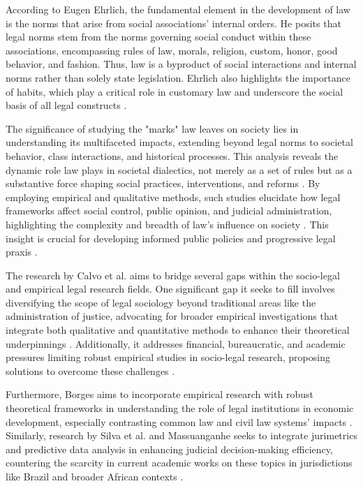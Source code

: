According to Eugen Ehrlich, the fundamental element in the development of law is the norms that arise from social associations' internal orders. He posits that legal norms stem from the norms governing social conduct within these associations, encompassing rules of law, morals, religion, custom, honor, good behavior, and fashion. Thus, law is a byproduct of social interactions and internal norms rather than solely state legislation. Ehrlich also highlights the importance of habits, which play a critical role in customary law and underscore the social basis of all legal constructs \cite{venturini2024, venturini2024p24-25, venturini2024p22-23, venturini2024p18-19}.

The significance of studying the "marks" law leaves on society lies in understanding its multifaceted impacts, extending beyond legal norms to societal behavior, class interactions, and historical processes. This analysis reveals the dynamic role law plays in societal dialectics, not merely as a set of rules but as a substantive force shaping social practices, interventions, and reforms \cite{law1982, calvo2024}. By employing empirical and qualitative methods, such studies elucidate how legal frameworks affect social control, public opinion, and judicial administration, highlighting the complexity and breadth of law's influence on society \cite{calvo2024, law1982}. This insight is crucial for developing informed public policies and progressive legal praxis \cite{massuanganhe2016, law1982}.

The research by Calvo et al. aims to bridge several gaps within the socio-legal and empirical legal research fields. One significant gap it seeks to fill involves diversifying the scope of legal sociology beyond traditional areas like the administration of justice, advocating for broader empirical investigations that integrate both qualitative and quantitative methods to enhance their theoretical underpinnings \cite{calvo2024, calvo2024}. Additionally, it addresses financial, bureaucratic, and academic pressures limiting robust empirical studies in socio-legal research, proposing solutions to overcome these challenges \cite{calvo2024}.

Furthermore, Borges aims to incorporate empirical research with robust theoretical frameworks in understanding the role of legal institutions in economic development, especially contrasting common law and civil law systems' impacts \cite{borges2015, borges2015}. Similarly, research by Silva et al. and Massuanganhe seeks to integrate jurimetrics and predictive data analysis in enhancing judicial decision-making efficiency, countering the scarcity in current academic works on these topics in jurisdictions like Brazil and broader African contexts \cite{silva2023, silva2023, massuanganhe2016, massuanganhe2016}.

